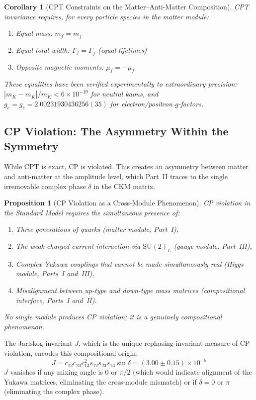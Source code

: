 \documentclass[12pt]{article}
\newtheorem{proposition}[theorem]{Proposition}
\newtheorem{corollary}[theorem]{Corollary}
\theoremstyle{definition}
\theoremstyle{remark}
\newcommand{\su}[1]{\mathrm{SU}(#1)}
\begin{document}
\begin{corollary}[CPT Constraints on the Matter--Anti-Matter Composition]
\label{cor:cpt-constraints}
CPT invariance requires, for every particle species in the matter module:
\begin{enumerate}
\item Equal mass: $m_f = m_{\bar{f}}$
\item Equal total width: $\Gamma_f = \Gamma_{\bar{f}}$ (equal lifetimes)
\item Opposite magnetic moments: $\mu_f = -\mu_{\bar{f}}$
\end{enumerate}
These equalities have been verified experimentally to extraordinary precision: $|m_K - m_{\bar{K}}|/m_K < 6 \times 10^{-19}$ for neutral kaons, and $g_e = g_{\bar{e}} = 2.00231930436256(35)$ for electron/positron $g$-factors.
\end{corollary}

\subsection{CP Violation: The Asymmetry Within the Symmetry}

While CPT is exact, CP is violated. This creates an asymmetry between matter and anti-matter at the amplitude level, which Part~II traces to the single irremovable complex phase $\delta$ in the CKM matrix.

\begin{proposition}[CP Violation as a Cross-Module Phenomenon]
\label{prop:cp-cross-module}
CP violation in the Standard Model requires the simultaneous presence of:
\begin{enumerate}
\item Three generations of quarks (matter module, Part~I),
\item The weak charged-current interaction via $\su{2}_L$ (gauge module, Part~III),
\item Complex Yukawa couplings that cannot be made simultaneously real (Higgs module, Parts~I and~III),
\item Misalignment between up-type and down-type mass matrices (compositional interface, Parts~I and~II).
\end{enumerate}
No single module produces CP violation; it is a genuinely compositional phenomenon.
\end{proposition}

The Jarlskog invariant $J$, which is the unique rephasing-invariant measure of CP violation, encodes this compositional origin:
\begin{equation}
J = c_{12}c_{23}c_{13}^2 s_{12}s_{23}s_{13}\sin\delta = (3.00 \pm 0.15) \times 10^{-5}
\end{equation}
$J$ vanishes if any mixing angle is 0 or $\pi/2$ (which would indicate alignment of the Yukawa matrices, eliminating the cross-module mismatch) or if $\delta = 0$ or $\pi$ (eliminating the complex phase).
\end{document}
